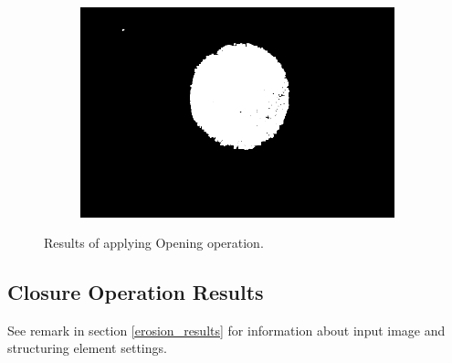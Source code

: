 \documentclass{article}
\begin{document}
\begin{figure}[H]
\begin{subfigure}{.09\textwidth}
  \label{fig:arrow}
\end{subfigure}%
\begin{subfigure}{.47\textwidth}
  \centering
  \includegraphics[width=0.97\linewidth]{_Figures/raw_data_4_opening.png}
  \caption{}
  \label{fig:raw_4_opening}
\end{subfigure}

\caption{Results of applying Opening operation. }
\label{fig:opening_results}
\end{figure}



%
%
\newpage
\subsection{Closure Operation Results}
See remark in section \ref{erosion_results} for information about input image and structuring element settings.
\end{document}
